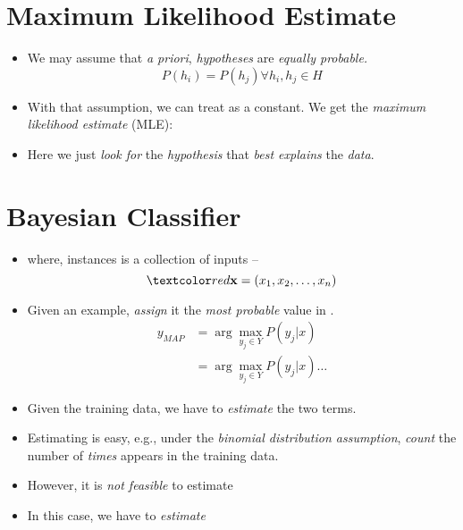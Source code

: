 \documentclass[
	number={3},
	title={Na\:ive Bayes Learning}
]{cs584notes}
\begin{document}
\section{Maximum Likelihood Estimate}\label{sec:maximum-likelihood-estimate}
\begin{itemize}
	\item We may assume that \emph{a priori}, \emph{hypotheses} are \emph{equally probable.}
	\[ P(h_{i}) = P(h_{j}) \forall h_{i}, h_{j} \in H \]
	\item With that assumption, we can treat  as a constant. We get the \emph{maximum likelihood estimate} (MLE):
	\item Here we just \emph{look for} the \emph{hypothesis} that \emph{best explains} the \emph{data}.
\end{itemize}

\section{Bayesian Classifier}\label{sec:bayesian-classifier}
\begin{itemize}
	\item {} where, instances  is a collection of inputs --
	\[ \data{ \vec{x} = (x_{1}, x_{2}, \dots, x_{n}) } \]
	\item Given an example, \emph{assign} it the \emph{most probable} value in .
	\begin{equation*}
	\begin{aligned}
		y_{MAP} &= \arg\max_{y_{j}\in Y} P(y_{j} | x)\\
				&= \arg\max_{y_{j}\in Y} P(y_{j} | x) \dots
	\end{aligned}
	\end{equation*}
	\item Given the training data, we have to \emph{estimate} the two terms.
	\item Estimating  is easy, e.g., under the \emph{binomial distribution assumption}, \emph{count} the number of \emph{times}  appears in the training data.
	\item However, it is \emph{not feasible} to estimate 
	\item In this case, we have to \emph{estimate}
\end{itemize}
\end{document}
